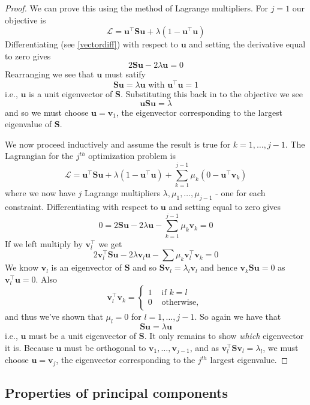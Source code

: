 \documentclass[
]{book}
\theoremstyle{definition}
\theoremstyle{definition}
\theoremstyle{definition}
\theoremstyle{definition}
\theoremstyle{remark}
\begin{document}
\begin{proof}
We can prove this using the method of Lagrange multipliers. For \(j=1\) our objective is
\[\mathcal{L} = \mathbf u^\top  \mathbf S\mathbf u+\lambda(1-\mathbf u^\top \mathbf u)\]
Differentiating (see \ref{vectordiff}) with respect to \(\mathbf u\) and setting the derivative equal to zero gives
\[2\mathbf S\mathbf u-2\lambda \mathbf u=0\]
Rearranging we see that \(\mathbf u\) must satify
\[\mathbf S\mathbf u=\lambda \mathbf u\mbox{ with } \mathbf u^\top \mathbf u=1\]
i.e., \(\mathbf u\) is a unit eigenvector of \(\mathbf S\). Substituting this back in to the objective we see
\[\mathbf u\mathbf S\mathbf u= \lambda\]
and so we must choose \(\mathbf u=\mathbf v_1\), the eigenvector corresponding to the largest eigenvalue of \(\mathbf S\).

We now proceed inductively and assume the result is true for \(k=1, \ldots, j-1\). The Lagrangian for the \(j^{th}\) optimization problem is
\[\mathcal{L} = \mathbf u^\top  \mathbf S\mathbf u+\lambda(1-\mathbf u^\top \mathbf u) +\sum_{k=1}^{j-1}\mu_k (0-\mathbf u^\top \mathbf v_k)\]
where we now have \(j\) Lagrange multipliers \(\lambda, \mu_1, \ldots, \mu_{j-1}\) - one for each constraint.
Differentiating with respect to \(\mathbf u\) and setting equal to zero gives
\[0 = 2\mathbf S\mathbf u- 2\lambda \mathbf u- \sum_{k=1}^{j-1} \mu_k\mathbf v_k=0 \]
If we left multiply by \(\mathbf v_l^\top\) we get
\[2\mathbf v_l^\top \mathbf S\mathbf u- 2\lambda \mathbf v_l \mathbf u- \sum \mu_k \mathbf v_l^\top \mathbf v_k =0\]
We know \(\mathbf v_l\) is an eigenvector of \(\mathbf S\) and so \(\mathbf S\mathbf v_l=\lambda_l \mathbf v_l\) and hence \(\mathbf v_k \mathbf S\mathbf u=0\) as \(\mathbf v_l^\top \mathbf u=0\). Also \[\mathbf v_l^\top\mathbf v_k=\begin{cases}1 &\mbox{ if } k=l\\
0 &\mbox{ otherwise, }\end{cases}\] and thus we've shown that \(\mu_l=0\) for \(l=1, \ldots, j-1\). So again we have that \[\mathbf S\mathbf u= \lambda \mathbf u\]
i.e., \(\mathbf u\) must be a unit eigenvector of \(\mathbf S\). It only remains to show \emph{which} eigenvector it is. Because \(\mathbf u\) must be orthogonal to \(\mathbf v_1, \ldots, \mathbf v_{j-1}\),
and as \(\mathbf v_l^\top \mathbf S\mathbf v_l = \lambda_l\), we must choose \(\mathbf u=\mathbf v_j\), the eigenvector corresponding to the \(j^{th}\) largest eigenvalue.
\end{proof}

\hypertarget{properties-of-principal-components}{%
\subsection{Properties of principal components}\label{properties-of-principal-components}}
\end{document}
